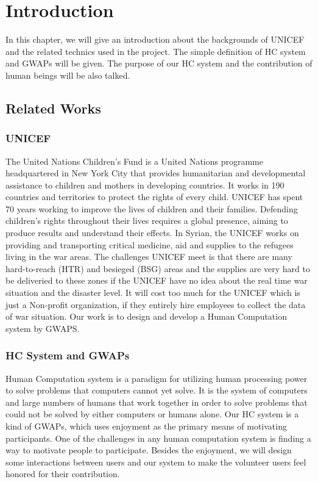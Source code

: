\section{Introduction}

In this chapter, we will give an introduction about the backgrounds of UNICEF and the related technics 
used in the project. The simple definition of HC system and GWAPs will be given. 
The purpose of our HC system and the contribution of human beings will be also talked.

\subsection{Related Works}

\subsubsection{UNICEF}
The United Nations Children's Fund\cite{unicef1994state} is a United Nations programme headquartered
in New York City that provides humanitarian and developmental assistance to 
children and mothers in developing countries. 
It works in 190 countries and territories to protect the rights of every child. 
UNICEF has spent 70 years working to improve the lives of children and their families. 
Defending children's rights throughout their lives requires a global presence, 
aiming to produce results and understand their effects. 
In Syrian, the UNICEF works on providing and transporting critical medicine, 
aid and supplies to the refugees living in the war areas. The challenges UNICEF meet is that 
there are many hard-to-reach (HTR) and besieged (BSG) areas and the supplies are 
very hard to be deliveried to these zones if the UNICEF have no idea about 
the real time war situation and the disaster level. It will cost too much for the UNICEF 
which is just a Non-profit organization, if they entirely hire employees to 
collect the data of war situation. 
Our work is to design and develop a Human Computation system by GWAPS\cite{lafourcade2015games}.

\subsubsection{HC System and GWAPs}
Human Computation system is a paradigm for utilizing human processing power to solve problems that 
computers cannot yet solve\cite{quinn2011human}. 
It is the system of computers and large numbers of humans that work together in order to solve problems that 
could not be solved by either computers or humans alone\cite{quinn2009taxonomy}.
Our HC system is a kind of GWAPs, which uses enjoyment as the primary means of motivating participants. 
One of the challenges in any human computation system is finding a way to motivate people 
to participate\cite{quinn2011human}. 
Besides the enjoyment, we will design some interactions between users and our system to 
make the volunteer users feel honored for their contribution.

